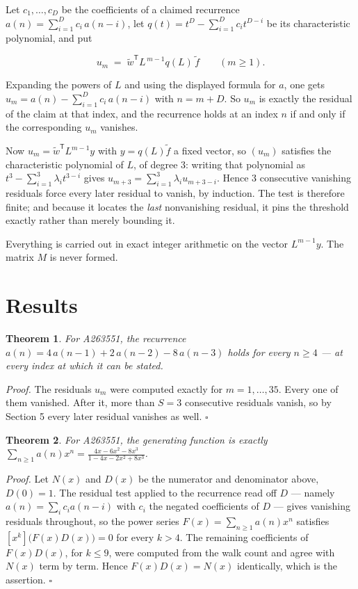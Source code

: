 \documentclass[11pt]{article}
\newtheorem{theorem}{Theorem}
\theoremstyle{definition}
\begin{document}
Let $c_1,\dots,c_D$ be the coefficients of a claimed recurrence $a(n) = \sum_{i=1}^{D} c_i\,a(n-i)$, let $q(t) = t^{D} - \sum_{i=1}^{D} c_i t^{D-i}$ be its characteristic polynomial, and put

\[u_m \;=\; \tilde w^{\mathsf T} L^{\,m-1} q(L)\,\tilde f \qquad (m \ge 1).\]

Expanding the powers of $L$ and using the displayed formula for $a$, one gets $u_m = a(n) - \sum_{i=1}^{D} c_i\,a(n-i)$ with $n = m + D$. So $u_m$ is exactly the residual of the claim at that index, and the recurrence holds at an index $n$ if and only if the corresponding $u_m$ vanishes.

Now $u_m = \tilde w^{\mathsf T} L^{m-1} y$ with $y = q(L)\tilde f$ a fixed vector, so $(u_m)$ satisfies the characteristic polynomial of $L$, of degree $3$: writing that polynomial as $t^{3} - \sum_{i=1}^{3} \lambda_i t^{3-i}$ gives $u_{m+3} = \sum_{i=1}^{3} \lambda_i u_{m+3-i}$. Hence $3$ consecutive vanishing residuals force every later residual to vanish, by induction. The test is therefore finite; and because it locates the {\itshape last} nonvanishing residual, it pins the threshold exactly rather than merely bounding it.

Everything is carried out in exact integer arithmetic on the vector $L^{m-1}y$. The matrix $M$ is never formed.

\section{Results}

\begin{theorem} For A263551, the recurrence $a(n) = 4\,a(n-1) + 2\,a(n-2) - 8\,a(n-3)$ holds for every $n \ge 4$ --- at every index at which it can be stated.\end{theorem}

{\itshape Proof.} The residuals $u_m$ were computed exactly for $m = 1,\dots,35$. Every one of them vanished. After it, more than $S = 3$ consecutive residuals vanish, so by Section 5 every later residual vanishes as well. $\square$

\begin{theorem} For A263551, the generating function is exactly $\sum_{n\ge 1} a(n)x^n = \frac{4x - 6x^{2} - 8x^{3}}{1 - 4x - 2x^{2} + 8x^{3}}$.\end{theorem}

{\itshape Proof.} Let $N(x)$ and $D(x)$ be the numerator and denominator above, $D(0)=1$. The residual test applied to the recurrence read off $D$ --- namely $a(n) = \sum_i c_i a(n-i)$ with $c_i$ the negated coefficients of $D$ --- gives vanishing residuals throughout, so the power series $F(x)=\sum_{n\ge 1}a(n)x^n$ satisfies $[x^k]\bigl(F(x)D(x)\bigr) = 0$ for every $k > 4$. The remaining coefficients of $F(x)D(x)$, for $k \le 9$, were computed from the walk count and agree with $N(x)$ term by term. Hence $F(x)D(x) = N(x)$ identically, which is the assertion. $\square$
\end{document}
